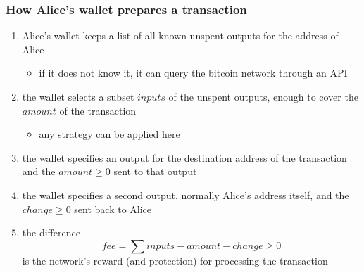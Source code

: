 \documentclass[11pt]{beamer}  %
\begin{document}
\begin{frame}\frametitle{How Alice's wallet prepares a transaction}

  \begin{enumerate}
  \item Alice's wallet keeps a list of all known unspent outputs for the address
    of Alice
    \begin{itemize}
    \item if it does not know it, it can query the bitcoin network through an API
    \end{itemize}
  \item the wallet selects a subset $\mathit{inputs}$ of the unspent outputs, enough to cover
    the $\mathit{amount}$ of the transaction
    \begin{itemize}
    \item any strategy can be applied here
    \end{itemize}
  \item the wallet specifies an output for the destination address of the transaction
    and the $\mathit{amount}\ge 0$ sent to that output
  \item the wallet specifies a second output, normally Alice's address itself, and the
    $\mathit{change}\ge 0$ sent back to Alice
  \item the difference
    \[
    \mathit{fee}=\sum\mathit{inputs}-\mathit{amount}-\mathit{change}\ge 0
    \]
    is the network's reward (and protection) for processing the transaction
  \end{enumerate}

\end{frame}
\end{document}

